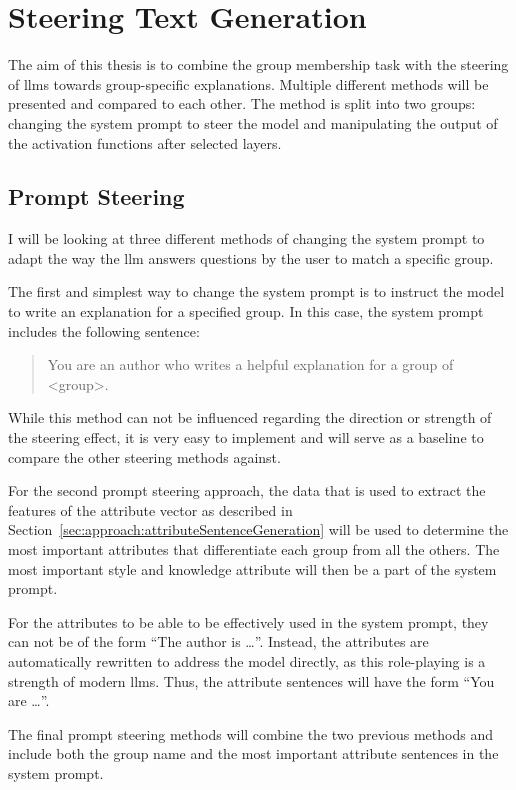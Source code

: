 \section{Steering Text Generation}
The aim of this thesis is to combine the group membership task with the steering of \acp{llm} towards group-specific explanations. Multiple different methods will be presented and compared to each other. The method is split into two groups: changing the system prompt to steer the model and manipulating the output of the activation functions after selected layers.

\subsection{Prompt Steering}
\label{sec:approach:steering:prompt}
I will be looking at three different methods of changing the system prompt to adapt the way the \ac{llm} answers questions by the user to match a specific group.

The first and simplest way to change the system prompt is to instruct the model to write an explanation for a specified group. In this case, the system prompt includes the following sentence:
\begin{quote}
  You are an author who writes a helpful explanation for a group of <group>.
\end{quote}

While this method can not be influenced regarding the direction or strength of the steering effect, it is very easy to implement and will serve as a baseline to compare the other steering methods against.

For the second prompt steering approach, the data that is used to extract the features of the attribute vector as described in Section~\ref{sec:approach:attributeSentenceGeneration} will be used to determine the most important attributes that differentiate each group from all the others. The most important style and knowledge attribute will then be a part of the system prompt.

For the attributes to be able to be effectively used in the system prompt, they can not be of the form \enquote{The author is \ldots}. Instead, the attributes are automatically rewritten to address the model directly, as this role-playing is a strength of modern \aclp{llm}. %
Thus, the attribute sentences will have the form \enquote{You are \ldots}.

The final prompt steering methods will combine the two previous methods and include both the group name and the most important attribute sentences in the system prompt.

